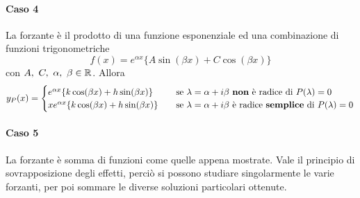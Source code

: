 \paragraph{Caso 4} La forzante è il prodotto di una funzione esponenziale ed una combinazione di funzioni trigonometriche
\begin{equation}
    f(x)=e^{\alpha x} \{A \sin(\beta x)+ C \cos(\beta x)\}
\end{equation}
con $A,\ C,\ \alpha,\ \beta \in \mathbb{R}$. Allora
\begin{equation}
    y_P(x)= \begin{cases}
        e^{\alpha x}\{k \cos(\beta x) + h \sin(\beta x)\} &\quad \text{se}\ \lambda=\alpha+i\beta\ \text{\textbf{non} è radice di}\ P(\lambda)=0\\
        xe^{\alpha x}\{k \cos(\beta x) + h \sin(\beta x)\} &\quad \text{se}\ \lambda=\alpha+i\beta\ \text{è radice \textbf{semplice} di}\ P(\lambda)=0\\ 
    \end{cases}
\end{equation}
\paragraph{Caso 5} La forzante è somma di funzioni come quelle appena mostrate. Vale il principio di sovrapposizione degli effetti, perciò si possono studiare singolarmente le varie forzanti, per poi sommare le diverse soluzioni particolari ottenute.
